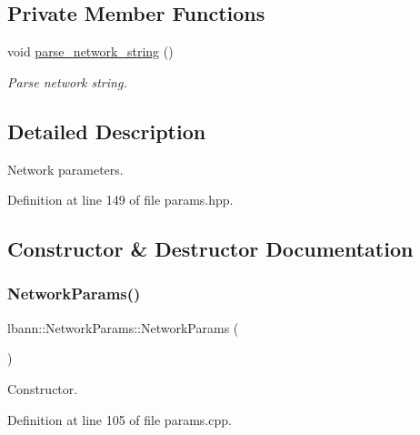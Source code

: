\subsection*{Private Member Functions}
\begin{DoxyCompactItemize}
\item 
void \hyperlink{classlbann_1_1NetworkParams_a14954fcbacb6c9522bd3cf6c28bc93d5}{parse\+\_\+network\+\_\+string} ()
\begin{DoxyCompactList}\small\item\em Parse network string. \end{DoxyCompactList}\end{DoxyCompactItemize}


\subsection{Detailed Description}
Network parameters. 

Definition at line 149 of file params.\+hpp.



\subsection{Constructor \& Destructor Documentation}
\mbox{\label{classlbann_1_1NetworkParams_ad915e046e5e001f37a5d0124809dd07b}} 
\subsubsection{\texorpdfstring{Network\+Params()}{NetworkParams()}}
{\footnotesize\ttfamily lbann\+::\+Network\+Params\+::\+Network\+Params (\begin{DoxyParamCaption}{ }\end{DoxyParamCaption})}



Constructor. 



Definition at line 105 of file params.\+cpp.


